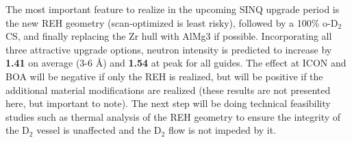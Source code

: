 \documentclass[a4paper]{jpconf}
\begin{document}
The most important feature to realize in the upcoming SINQ upgrade period is the new REH geometry (scan-optimized is least risky), followed by a 100\% o-D$_2$ CS, and finally replacing the Zr hull with AlMg3 if possible.  Incorporating all three attractive upgrade options, neutron intensity is predicted to increase by {\bf 1.41} on average (3-6 {\AA}) and {\bf 1.54} at peak for all guides.  The effect at ICON and BOA will be negative if only the REH is realized, but will be positive if the additional material modifications are realized (these results are not presented here, but important to note).  The next step will be doing technical feasibility studies such as thermal analysis of the REH geometry to ensure the integrity of the D$_2$ vessel is unaffected and the D$_2$ flow is not impeded by it.

\end{document}
